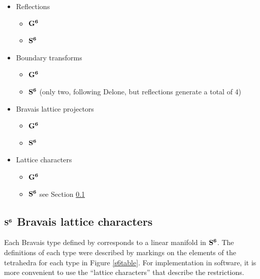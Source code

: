 \documentclass[preprint]{iucr}              %
\numberwithin{equation}{section}
\newcommand{\SVI}[0]{$\bf{S^{6}}$}
\newcommand{\GVI}[0]{$\bf{G^{6}}$}
\begin{document}
\begin{itemize}
	\item 		Reflections
	 		\begin{itemize}
		 			\item 	\GVI{} \cite{Andrews2014}
		 			\item \SVI{} \cite{Andrews2019b}
		 		\end{itemize}
	\item	Boundary transforms
	 		\begin{itemize}
		 			\item 	\GVI{} \cite{Andrews2014}
		 			\item 	\SVI{} \cite{Andrews2019a} (only two, following Delone, but reflections generate a total of 4)
		 		\end{itemize}
	\item 		Bravais lattice projectors
	 		\begin{itemize}
		 			\item 	\GVI{} \cite{paciorek1992projection}
		 			\item 	\SVI{} \cite{andrews2022generating}
		 		\end{itemize}
	\item 		Lattice characters
	 		\begin{itemize}
		 			\item \GVI{} \cite{Andrews2014}
		 			\item \SVI{} see Section \ref{characters}
		 	\end{itemize}
\end{itemize}
	
\subsection{\SVI{} Bravais lattice characters}
		\label{characters}

Each Bravais type defined by  corresponds
to a linear manifold in \SVI{}. The definitions of each type
were described by markings on the elements of the tetrahedra
for each type in Figure \ref{s6table}. For implementation
in software, it is
more convenient to use the ``lattice characters'' that describe
the restrictions.
\end{document}
